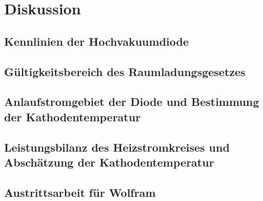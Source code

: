 \section{Diskussion}
\label{sec:Diskussion}

\subsection{Kennlinien der Hochvakuumdiode}

\subsection{Gültigkeitsbereich des Raumladungsgesetzes}

\subsection{Anlaufstromgebiet der Diode und Bestimmung der Kathodentemperatur}

\subsection{Leistungsbilanz des Heizstromkreises und Abschätzung der Kathodentemperatur}

\subsection{Austrittsarbeit für Wolfram}